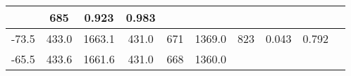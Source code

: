 \documentclass[a4paper,10pt]{article}
\begin{document}
\begin{longtable}{
     |
%    
    c|
%    
    c|
%    
    c|
%    
    c|
%    
    c|
%    
    c|
%    
    c|
%    
    c|
%    
    c|
%    
    c|
%    
    }
%        
        & 685
%        

%        

%        
        & 0.923
%        

%        

%        
        & 0.983
%        

%        
        \\
        \hline

        

%        

%        
        -73.5
%        

%        

%        
        & 433.0
%        

%        

%        
        & 1663.1
%        

%        

%        
        & 431.0
%        

%        

%        
        & 671
%        

%        

%        
        & 1369.0
%        

%        

%        
        & 823
%        

%        

%        
        & 0.043
%        

%        

%        
        & 0.792
%        

%        
        \\
        \hline

        

%        

%        
        -65.5
%        

%        

%        
        & 433.6
%        

%        

%        
        & 1661.6
%        

%        

%        
        & 431.0
%        

%        

%        
        & 668
%        

%        

%        
        & 1360.0
%        

%        


\end{longtable}
\end{document}
